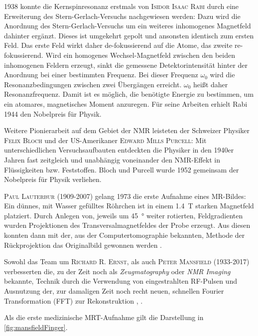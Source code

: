 1938 konnte die Kernspinresonanz erstmals von \textsc{Isidor Isaac Rabi} durch eine Erweiterung des Stern-Gerlach-Versuchs nachgewiesen werden: Dazu wird die Anordnung des Stern-Gerlach-Versuchs um ein weiteres inhomogenes Magnetfeld dahinter ergänzt. Dieses ist umgekehrt gepolt und ansonsten identisch zum ersten Feld. Das erste Feld wirkt daher de-fokussierend auf die Atome, das zweite re-fokussierend. Wird ein homogenes Wechsel-Magnetfeld zwischen den beiden inhomogenen Feldern erzeugt, sinkt die gemessene Detektorintensität hinter der Anordnung bei einer bestimmten Frequenz. Bei dieser Frequenz $\omega_0$ wird die Resonanzbedingungen zwischen zwei Übergängen erreicht. $\omega_0$ heißt daher Resonanzfrequenz. Damit ist es möglich, die benötigte Energie zu bestimmen, um ein atomares, magnetisches Moment anzuregen. Für seine Arbeiten erhielt Rabi 1944 den Nobelpreis für Physik. \cite{Rabi1938}

Weitere Pionierarbeit auf dem Gebiet der NMR leisteten der Schweizer Physiker \textsc{Felix Bloch} und der US-Amerikaner \textsc{Edward Mills Purcell}: Mit unterschiedlichen Versuchsaufbauten entdeckten die Physiker in den 1940er Jahren fast zeitgleich und unabhängig voneinander den NMR-Effekt in Flüssigkeiten bzw. Feststoffen. Bloch und Purcell wurde 1952 gemeinsam der Nobelpreis für Physik verliehen.

\textsc{Paul Lauterbur} (1909-2007) gelang 1973 die erste Aufnahme eines MR-Bildes: Ein dünnes, mit Wasser gefülltes Röhrchen ist in einem \SI{1.4}{\tesla} starken Magnetfeld platziert. Durch Anlegen von, jeweils um \SI{45}{\degree} weiter rotierten, Feldgradienten wurden Projektionen des Transversalmagnetfeldes der Probe erzeugt. Aus diesen konnten dann mit der, aus der Computertomographie bekannten, Methode der Rückprojektion das Originalbild gewonnen werden \cite{LAUTERBUR1973}.

Sowohl das Team um \textsc{Richard R. Ernst}, als auch \textsc{Peter Mansfield} (1933-2017) verbesserten die, zu der Zeit noch als \textit{Zeugmatography} oder \textit{NMR Imaging} bekannte, Technik durch die Verwendung von eingestrahlten RF-Pulsen und Ausnutzung der, zur damaligen Zeit noch recht neuen, schnellen Fourier Transformation (FFT) zur Rekonstruktion \cite{Kumar1975}, \cite{Mansfield1977}.

Als die erste medizinische MRT-Aufnahme gilt die Darstellung in \autoref{fig:mansfieldFinger}.

